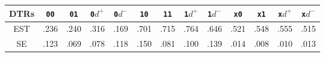 \begin{tabular}{c| cccc| cccc| cccc}
\toprule
DTRs & \texttt{00} & \texttt{01} & \texttt{0$d^+$} & \texttt{0$d^-$} & \texttt{10} & \texttt{11} & \texttt{1$d^+$} & \texttt{1$d^-$} & \texttt{x0} & \texttt{x1} & \texttt{x$d^+$} & \texttt{x$d^-$} \\
\midrule
EST & .236 & .240 & .316 & .169 & .701 & .715 & .764 & .646 & .521 & .548 & .555 & .515 \\
SE & .123 & .069 & .078 & .118 & .150 & .081 & .100 & .139 & .014 & .008 & .010 & .013 \\
\bottomrule
\end{tabular}

